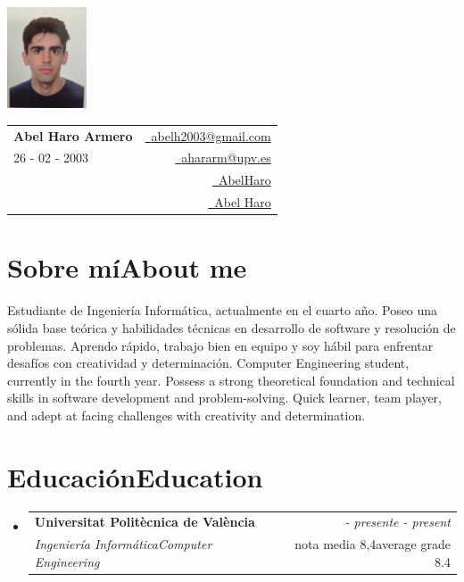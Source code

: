 \documentclass[11pt,a4paper]{article}
\makeatletter
\newcommand{\resumeSubheading}[4]{
\vspace{0.5mm}\item
    \begin{tabular*}{0.98\textwidth}[t]{l@{\extracolsep{\fill}}r}
        \textbf{#1} & \textit{\footnotesize{#4}} \\
        \textit{\footnotesize{#3}} &  \footnotesize{#2}\\
    \end{tabular*}
    \vspace{-2.4mm}
}
\newcommand{\resumeSubHeadingListStart}{\begin{itemize}[leftmargin=*,labelsep=0mm]}
\newcommand{\resumeSubHeadingListEnd}{\end{itemize}\vspace{2mm}}
\newcommand{\name}{Abel Haro Armero}
\newcommand{\emaila}{abelh2003@gmail.com}
\newcommand{\emailb}{ahararm@upv.es}
\newcommand{\cvdate}{26 - 02 - 2003}
\makeatother
\begin{document}
\selectfont

\parbox{2.6cm}{%
\includegraphics[width=2.35cm,clip]{CV_foto.jpeg}
}
\parbox{\dimexpr\linewidth-2.9cm\relax}{
\begin{tabularx}{\linewidth}{L r}
  \textbf{\Large \name} & \href{mailto:\emaila}{\raisebox{0.0\height}{\footnotesize \faEnvelope}\ {\emaila}} \\
  \cvdate & \href{mailto:\emailb}{\raisebox{0.0\height}{\footnotesize \faEnvelope}\ {\emailb}} \\
  {} & \href{https://github.com/AbelHaro}{\raisebox{0.0\height}{\footnotesize \faGithub}\ {AbelHaro}} \\
  {} & \href{https://www.linkedin.com/in/abel-haro-54bb6518a}{\raisebox{0.0\height}{\footnotesize \faLinkedin}\ {Abel Haro}}
\end{tabularx}
}

\section{\textbf{\ifdefined\spanish Sobre mí\else About me\fi}}
\vspace{0.1cm}
\ifdefined\spanish
  Estudiante de Ingeniería Informática, actualmente en el cuarto año. Poseo una sólida base teórica
y habilidades técnicas en desarrollo de software y resolución de
problemas. Aprendo rápido, trabajo bien en equipo y soy hábil para enfrentar
desafíos con creatividad y determinación.
\else
  Computer Engineering student, currently in the fourth year. Possess a strong theoretical foundation
and technical skills in software development and problem-solving. Quick learner, 
team player, and adept at facing challenges with creativity and determination.
\fi
\vspace{-5.5mm}
\vspace{0.3cm}

\section{\textbf{\ifdefined\spanish Educación\else Education\fi}}
  \resumeSubHeadingListStart
    \resumeSubheading
      {Universitat Politècnica de València}{\ifdefined\spanish nota media 8,4\else average grade 8.4\fi}
      {\ifdefined\spanish Ingeniería Informática\else Computer Engineering\fi}
      {\ifdefined\spanish 2021 - presente\else 2021 - present\fi}
  \resumeSubHeadingListEnd
\vspace{-5.5mm}
\end{document}
